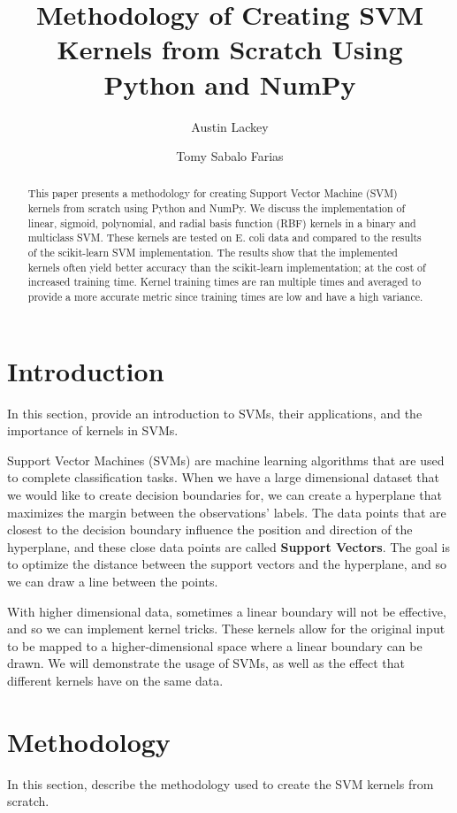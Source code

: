 \documentclass[12pt]{article}
\title{Methodology of Creating SVM Kernels from Scratch Using Python and NumPy}
\author{Austin Lackey}
\author{Tomy Sabalo Farias}
\affil{DSCI 320, Colorado State University}
\begin{document}
\maketitle

\begin{abstract}
This paper presents a methodology for creating Support Vector Machine (SVM) kernels from scratch using Python and NumPy. 
We discuss the implementation of linear, sigmoid, polynomial, and radial basis function (RBF) kernels in a binary and multiclass SVM.
These kernels are tested on E. coli data and compared to the results of the scikit-learn SVM implementation.
The results show that the implemented kernels often yield better accuracy than the scikit-learn implementation; at the
cost of increased training time. Kernel training times are ran multiple times and averaged to provide a more accurate
metric since training times are low and have a high variance.
\end{abstract}

\section{Introduction}
In this section, provide an introduction to SVMs, their applications, and the importance of
kernels in SVMs.

Support Vector Machines (SVMs) are machine learning algorithms that are used to complete classification tasks. When we have a large dimensional dataset that we would like to create decision boundaries for, we can create a hyperplane that maximizes the margin between the observations' labels. The data points that are closest to the decision boundary influence the position and direction of the hyperplane, and these close data points are called \textbf{Support Vectors}. The goal is to optimize the distance between the support vectors and the hyperplane, and so we can draw a line between the points.

With higher dimensional data, sometimes a linear boundary will not be effective, and so we can implement kernel tricks. These kernels allow for the original input to be mapped to a higher-dimensional space where a linear boundary can be drawn. We will demonstrate the usage of SVMs, as well as the effect that different kernels have on the same data. 

\section{Methodology}
In this section, describe the methodology used to create the SVM kernels from scratch.
\end{document}
